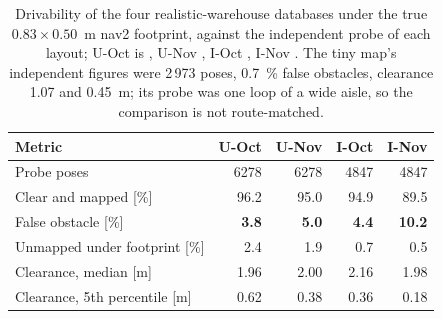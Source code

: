 \documentclass[11pt,a4paper,notitlepage]{report}
\begin{document}
\begin{table}[htbp]
\centering
\caption[Occupied-cell geometry of the four realistic databases.]{Occupied-cell
geometry of the four realistic-warehouse databases
against their world files at \SI{0.25}{\metre} tolerance, beside the tiny map.
Bold marks a value below the fixed criterion.}
\label{tab:map-realistic-geometry}
\small
\setlength{\tabcolsep}{4pt}
\end{table}

\begin{table}[htbp]
\centering
\caption[Drivability of the realistic-warehouse databases under the true nav2
footprint, against independent routes.]{Drivability of the four
realistic-warehouse databases under the true $0.83\times0.50$~m nav2
footprint, against the independent probe of each layout; U-Oct is
, U-Nov , I-Oct
, I-Nov . The
tiny map's independent figures were 2\,973 poses, \SI{0.7}{\percent} false
obstacles, clearance 1.07 and \SI{0.45}{\metre}; its probe was one loop of a
wide aisle, so the comparison is not route-matched.}
\label{tab:map-realistic-drivability}
\footnotesize
\setlength{\tabcolsep}{4pt}
\begin{tabular}{lrrrr}
\toprule
Metric & U-Oct & U-Nov & I-Oct & I-Nov \\
\midrule
Probe poses & 6278 & 6278 & 4847 & 4847 \\
Clear and mapped [\si{\percent}] & 96.2 & 95.0 & 94.9 & 89.5 \\
False obstacle [\si{\percent}] & \textbf{3.8} & \textbf{5.0} & \textbf{4.4} & \textbf{10.2} \\
Unmapped under footprint [\si{\percent}] & 2.4 & 1.9 & 0.7 & 0.5 \\
Clearance, median [\si{\metre}] & 1.96 & 2.00 & 2.16 & 1.98 \\
Clearance, 5th percentile [\si{\metre}] & 0.62 & 0.38 & 0.36 & 0.18 \\
\bottomrule
\end{tabular}
\end{table}
\end{document}
